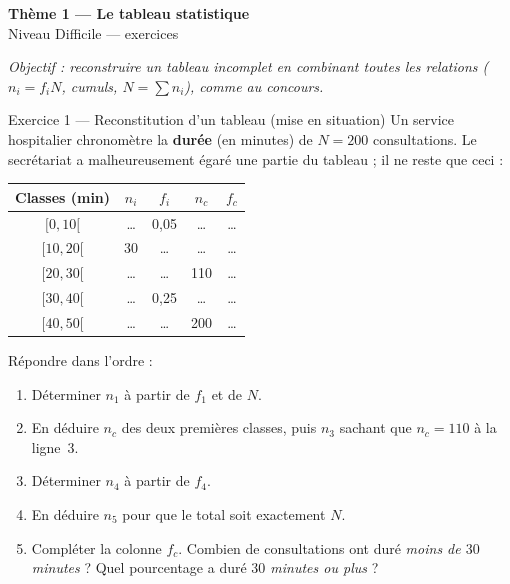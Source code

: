 \documentclass[11pt,a4paper]{article}
\newcommand{\bandeau}[2]{%
\begin{tcolorbox}[boxbase,colback=primary,colframe=primarydark,halign=center,
   before skip=2pt,after skip=12pt]
{\LARGE\bfseries\color{white} #1}\\[3pt]{\normalsize\color{white} #2}
\end{tcolorbox}}
\begin{document}
\bandeau{Thème 1 — Le tableau statistique}{Niveau Difficile — exercices}

\noindent\textit{Objectif : reconstruire un tableau incomplet en combinant toutes les relations
($n_i=f_i N$, cumuls, $N=\sum n_i$), comme au concours.}\medskip

\begin{exobox}{Exercice 1 — Reconstitution d'un tableau (mise en situation)}
Un service hospitalier chronomètre la \textbf{durée} (en minutes) de $N=200$ consultations. Le
secrétariat a malheureusement égaré une partie du tableau ; il ne reste que ceci :
\begin{center}
\renewcommand{\arraystretch}{1.25}
\begin{tabular}{|c|c|c|c|c|}
\hline
Classes (min) & $n_i$ & $f_i$ & $n_c$ & $f_c$ \\\hline
$[0,10[$   & \dots  & 0{,}05 & \dots & \dots \\
$[10,20[$  & 30     & \dots  & \dots & \dots \\
$[20,30[$  & \dots  & \dots  & 110   & \dots \\
$[30,40[$  & \dots  & 0{,}25 & \dots & \dots \\
$[40,50[$  & \dots  & \dots  & 200   & \dots \\\hline
\end{tabular}
\end{center}
Répondre dans l'ordre :
\begin{enumerate}[label=\textbf{(\alph*)}]
  \item Déterminer $n_1$ à partir de $f_1$ et de $N$.
  \item En déduire $n_c$ des deux premières classes, puis $n_3$ sachant que $n_c=110$ à la ligne~3.
  \item Déterminer $n_4$ à partir de $f_4$.
  \item En déduire $n_5$ pour que le total soit exactement $N$.
  \item Compléter la colonne $f_c$. Combien de consultations ont duré \emph{moins de $30$ minutes} ?
        Quel pourcentage a duré \emph{$30$ minutes ou plus} ?
\end{enumerate}
\end{exobox}
\end{document}
